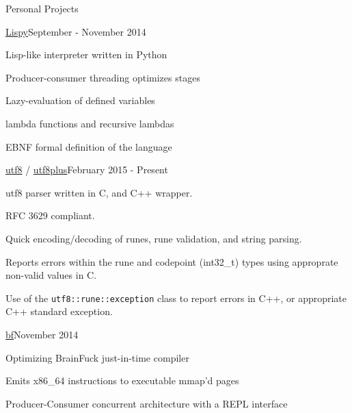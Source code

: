 \documentclass{resume} %
\begin{document}
\begin{rSection}{Personal Projects}

\begin{rSubsection}{\href{http://github.com/cptaffe/lispy}{Lispy}}{September - November 2014}{}{}

	\item Lisp-like interpreter written in Python
	\item Producer-consumer threading optimizes stages
	\item Lazy-evaluation of defined variables
	\item lambda functions and recursive lambdas
	\item EBNF formal definition of the language
\end{rSubsection}

\begin{rSubsection}{\href{http://github.com/cptaffe/utf8}{utf8} / \href{http://github.com/cptaffe/utf8plus}{utf8plus}}{February 2015 - Present}{}{}

	\item utf8 parser written in C, and C++ wrapper.
	\item RFC 3629 compliant.
	\item Quick encoding/decoding of runes, rune validation, and string parsing.
	\item Reports errors within the rune and codepoint (int32\_t) types using approprate non-valid values in C.
	\item Use of the \verb!utf8::rune::exception! class to report errors in C++, or appropriate C++ standard exception.
\end{rSubsection}

\begin{rSubsection}{\href{http://github.com/cptaffe/bf}{bf}}{November 2014}{}{}

	\item Optimizing BrainFuck just-in-time compiler
	\item Emits x86\_64 instructions to executable mmap'd pages
	\item Producer-Consumer concurrent architecture with a REPL interface
\end{rSubsection}

\end{rSection}

\clearpage

\end{document}
